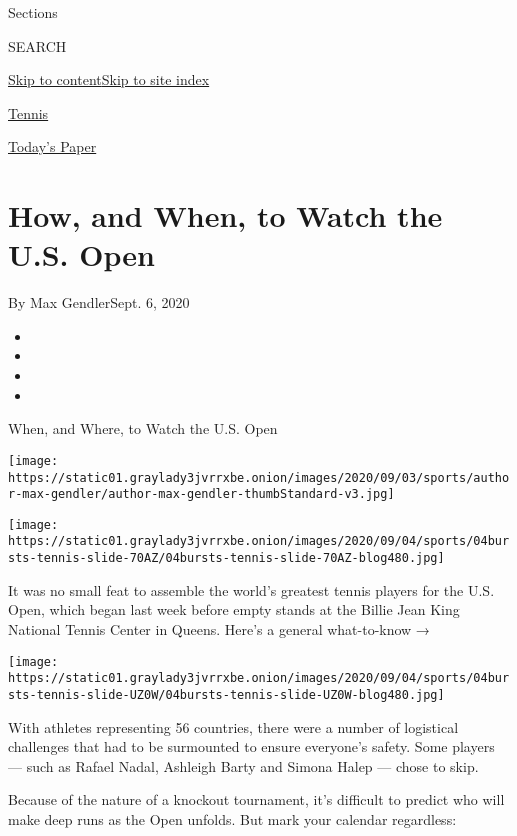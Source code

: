 Sections

SEARCH

\protect\hyperlink{site-content}{Skip to
content}\protect\hyperlink{site-index}{Skip to site index}

\href{https://www.nytimes3xbfgragh.onion/section/sports/tennis}{Tennis}

\href{https://myaccount.nytimes3xbfgragh.onion/auth/login?response_type=cookie\&client_id=vi}{}

\href{https://www.nytimes3xbfgragh.onion/section/todayspaper}{Today's
Paper}

\hypertarget{how-and-when-to-watch-the-us-open}{%
\section{How, and When, to Watch the U.S.
Open}\label{how-and-when-to-watch-the-us-open}}

By Max GendlerSept. 6, 2020

\begin{itemize}
\item
\item
\item
\item
\end{itemize}

When, and Where, to Watch the U.S. Open

\texttt{[image: https://static01.graylady3jvrrxbe.onion/images/2020/09/03/sports/author-max-gendler/author-max-gendler-thumbStandard-v3.jpg]}

\texttt{[image: https://static01.graylady3jvrrxbe.onion/images/2020/09/04/sports/04bursts-tennis-slide-70AZ/04bursts-tennis-slide-70AZ-blog480.jpg]}

It was no small feat to assemble the world's greatest tennis players for
the U.S. Open, which began last week before empty stands at the Billie
Jean King National Tennis Center in Queens. Here's a general
what-to-know →

\texttt{[image: https://static01.graylady3jvrrxbe.onion/images/2020/09/04/sports/04bursts-tennis-slide-UZ0W/04bursts-tennis-slide-UZ0W-blog480.jpg]}

With athletes representing 56 countries, there were a number of
logistical challenges that had to be surmounted to ensure everyone's
safety. Some players --- such as Rafael Nadal, Ashleigh Barty and Simona
Halep --- chose to skip.

Because of the nature of a knockout tournament, it's difficult to
predict who will make deep runs as the Open unfolds. But mark your
calendar regardless:

